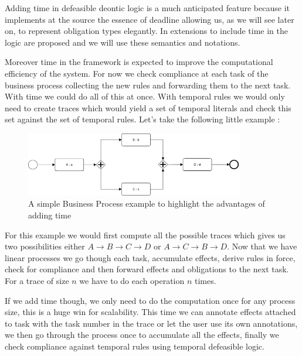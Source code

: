 \documentclass[10pt]{report}
\begin{document}
Adding time in defeasible deontic logic is a much anticipated feature because it implements at the source the essence of deadline allowing us, as we will see later on, to represent obligation types elegantly. In \autocite{TemporalExtension2007} extensions to include time in the logic are proposed and we will use these semantics and notations.

Moreover time in the framework is expected to improve the computational efficiency of the system. For now we check compliance at each task of the business process collecting the new rules and forwarding them to the next task. With time we could do all of this at once. With temporal rules we would only need to create traces which would yield a set of temporal literals and check this set against the set of temporal rules. Let's take the following little example : 

\begin{figure}[!h] %
\begin{center}
\includegraphics[width=0.85\textwidth]{temporalExample1.png} %
\caption{A simple Business Process example to highlight the advantages of adding time} %
\end{center}
\end{figure} %

For this example we would first compute all the possible traces which gives us two possibilities either $A \rightarrow B \rightarrow C \rightarrow D$ or $A \rightarrow C \rightarrow B \rightarrow D$. Now that we have linear processes we go though each task, accumulate effects, derive rules in force, check for compliance and then forward effects and obligations to the next task. For a trace of size $n$ we have to do each operation $n$ times.

If we add time though, we only need to do the computation once for any process size, this is a huge win for scalability. This time we can annotate effects attached to task with the task number in the trace or let the user use its own annotations, we then go through the process once to accumulate all the effects, finally we check compliance against temporal rules using temporal defeasible logic.
\end{document}
